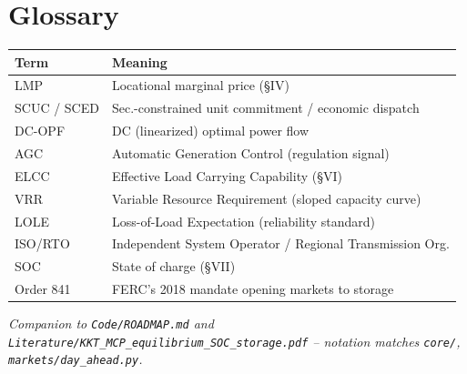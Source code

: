 \documentclass[10pt,conference]{IEEEtran}
\begin{document}
\section{Glossary}
\begin{table}[h]
\centering
\small
\begin{tabularx}{\linewidth}{@{}lX@{}}
\toprule
\textbf{Term} & \textbf{Meaning} \\
\midrule
LMP & Locational marginal price (\S IV) \\
SCUC / SCED & Sec.-constrained unit commitment / economic dispatch \\
DC-OPF & DC (linearized) optimal power flow \\
AGC & Automatic Generation Control (regulation signal) \\
ELCC & Effective Load Carrying Capability (\S VI) \\
VRR & Variable Resource Requirement (sloped capacity curve) \\
LOLE & Loss-of-Load Expectation (reliability standard) \\
ISO/RTO & Independent System Operator / Regional Transmission Org. \\
SOC & State of charge (\S VII) \\
Order 841 & FERC's 2018 mandate opening markets to storage \\
\bottomrule
\end{tabularx}
\end{table}

\vfill
\noindent\footnotesize\textit{Companion to \texttt{Code/ROADMAP.md} and
\texttt{Literature/KKT\_MCP\_equilibrium\_SOC\_storage.pdf} -- notation matches
\texttt{core/}, \texttt{markets/day\_ahead.py}.}
\end{document}
